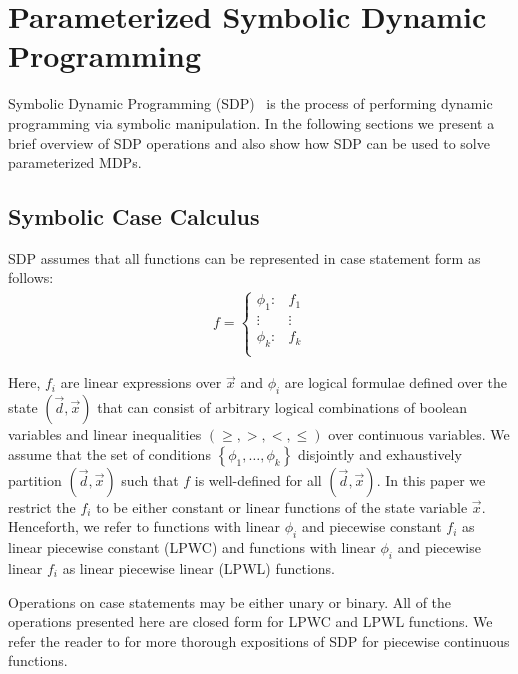 \section{Parameterized Symbolic Dynamic Programming}
\label{sec:sdp}

Symbolic Dynamic Programming (SDP)~\parencite{Boutilier_IJCAI_2001} is the process of performing dynamic programming
via symbolic manipulation. In the following sections we present a brief overview of SDP operations and also show
how SDP can be used to solve parameterized MDPs.

\subsection{Symbolic Case Calculus}

SDP assumes that all functions can be represented in case statement form \parencite{Boutilier_IJCAI_2001} as follows:
{\footnotesize 
    \abovedisplayskip=5pt
    \belowdisplayskip=0pt
    \begin{align*}
        f = 
        \begin{cases}
            \phi_1: & f_1 \\ 
            \vdots & \vdots\\ 
            \phi_k: & f_k \\ 
        \end{cases}
    \end{align*}
}%

Here, $ f_i $ are linear expressions over $ \vec{x} $ and $\phi_i$ are logical formulae defined over the state $( \vec{d}, \vec{x})$ that can consist of arbitrary logical combinations of boolean variables and linear inequalities $\left( \geq, >, <, \leq \right)$ over continuous variables. We assume that the set of conditions $\left\lbrace \phi_1, \ldots, \phi_k \right\rbrace$ disjointly and exhaustively partition $(\vec{d}, \vec{x})$ such that $f$ is well-defined for all $(\vec{d}, \vec{x})$. In this paper we restrict the $f_i$ to be either constant or linear functions of the state variable $\vec{x}$. Henceforth, we refer to functions with linear $\phi_i$ and piecewise constant $f_i$ as linear piecewise constant (LPWC) and functions with linear $\phi_i$ and piecewise linear $f_i$ as linear piecewise linear (LPWL) functions.

Operations on case statements may be either unary or binary. All of the operations presented here are closed form for LPWC and LPWL functions. We refer the reader to \parencite{Sanner_UAI_2011,Zamani_AAAI_2012} for more thorough expositions of SDP for piecewise continuous functions.

